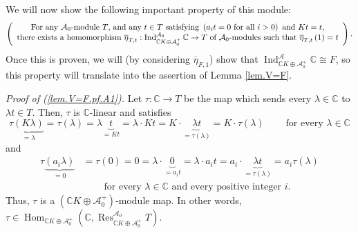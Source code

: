 \documentclass
[numbers=enddot,12pt,final,onecolumn,german,notitlepage]{scrartcl}%
\theoremstyle{definition}
\begin{document}
We will now show the following important property of this module:
\begin{equation}
\left(
\begin{array}
[c]{c}%
\text{For any }\mathcal{A}_{0}\text{-module }T\text{, and any }t\in T\text{
satisfying }\left(  a_{i}t=0\text{ for all }i>0\right)  \text{ and
}Kt=t\text{,}\\
\text{there exists a homomorphism }\overline{\eta}_{T,t}:\operatorname*{Ind}%
\nolimits_{\mathbb{C}K\oplus\mathcal{A}_{0}^{+}}^{\mathcal{A}_{0}}%
\mathbb{C}\rightarrow T\text{ of }\mathcal{A}_{0}\text{-modules such that
}\overline{\eta}_{T,t}\left(  1\right)  =t
\end{array}
\right)  . \label{lem.V=F.pf.A1}%
\end{equation}
Once this is proven, we will (by considering $\overline{\eta}_{F,1}$) show
that $\operatorname*{Ind}\nolimits_{\mathbb{C}K\oplus\mathcal{A}_{0}^{+}%
}^{\mathcal{A}}\mathbb{C}\cong F$, so this property will translate into the
assertion of Lemma \ref{lem.V=F}.

\textit{Proof of (\ref{lem.V=F.pf.A1}).} Let $\tau:\mathbb{C}\rightarrow T$ be
the map which sends every $\lambda\in\mathbb{C}$ to $\lambda t\in T$. Then,
$\tau$ is $\mathbb{C}$-linear and satisfies%
\[
\tau\underbrace{\left(  K\lambda\right)  }_{=\lambda}=\tau\left(
\lambda\right)  =\lambda\underbrace{t}_{=Kt}=\lambda\cdot Kt=K\cdot
\underbrace{\lambda t}_{=\tau\left(  \lambda\right)  }=K\cdot\tau\left(
\lambda\right)  \ \ \ \ \ \ \ \ \ \ \text{for every }\lambda\in\mathbb{C}%
\]
and%
\begin{align*}
\tau\underbrace{\left(  a_{i}\lambda\right)  }_{=0}  &  =\tau\left(  0\right)
=0=\lambda\cdot\underbrace{0}_{=a_{i}t}=\lambda\cdot a_{i}t=a_{i}%
\cdot\underbrace{\lambda t}_{=\tau\left(  \lambda\right)  }=a_{i}\tau\left(
\lambda\right) \\
&  \ \ \ \ \ \ \ \ \ \ \text{for every }\lambda\in\mathbb{C}\text{ and every
positive integer }i\text{.}%
\end{align*}
Thus, $\tau$ is a $\left(  \mathbb{C}K\oplus\mathcal{A}_{0}^{+}\right)
$-module map. In other words, $\tau\in\operatorname*{Hom}\nolimits_{\mathbb{C}%
K\oplus\mathcal{A}_{0}^{+}}\left(  \mathbb{C},\operatorname*{Res}%
\nolimits_{\mathbb{C}K\oplus\mathcal{A}_{0}^{+}}^{\mathcal{A}_{0}}T\right)  $.
\end{document}
